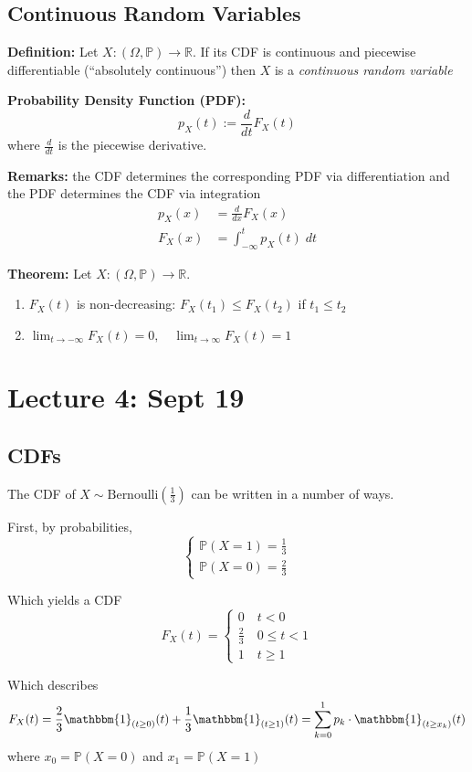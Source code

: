 \documentclass[12pt]{article}
\renewcommand{\P}{\mathbb{P}}
\newcommand{\R}{\mathbb{R}}
\newcommand{\ind}{\mathbbm{1}}
\begin{document}
\subsection*{Continuous Random Variables}
\textbf{Definition:} Let $X : (\Omega, \P) \to \R$. If its CDF is continuous and piecewise differentiable (``absolutely continuous'') then $X$ is a \emph{continuous random variable}

\textbf{Probability Density Function (PDF):} 
\[p_X(t) := \frac{d}{dt}F_X(t)\]
where $\frac{d}{dt}$ is the piecewise derivative. 

\textbf{Remarks:} the CDF determines the corresponding PDF via differentiation and the PDF determines the CDF via integration
\begin{align*}
    p_X(x) &= \frac{d}{dx} F_X(x)\\
    F_X(x) &= \int_{-\infty}^t p_X(t)\; dt
\end{align*}

\textbf{Theorem:} Let $X : (\Omega, \P) \to \R$. 
\begin{enumerate}
    \item $F_X(t)$ is non-decreasing: $F_X(t_1) \leq F_X(t_2)$ if $t_1 \leq t_2$
    \item $\lim_{t\to -\infty} F_X(t) = 0, \quad \lim_{t\to \infty} F_X(t) = 1$ 
\end{enumerate}

\section*{Lecture 4: Sept 19}
\subsection*{CDFs}
The CDF of $X \sim \text{Bernoulli}(\frac{1}{3})$ can be written in a number of ways.

First, by probabilities, 
\[\begin{cases}
    \P(X = 1) = \frac{1}{3}\\
    \P(X = 0) = \frac{2}{3}
\end{cases}\]

Which yields a CDF
\[F_X(t) = \begin{cases}
    0 \quad t < 0\\
    \frac{2}{3} \quad 0 \leq t < 1\\
    1 \quad t \geq 1
\end{cases}\]

Which describes
\[F_X(t) = \frac{2}{3} \ind_{(t \geq 0)}(t) + \frac{1}{3}\ind_{(t \geq 1)}(t) = \sum_{k=0}^1 p_k \cdot \ind_{(t\geq x_k)}(t)\]
where $x_0 = \P(X = 0)$ and $x_1 = \P(X = 1)$
\end{document}
